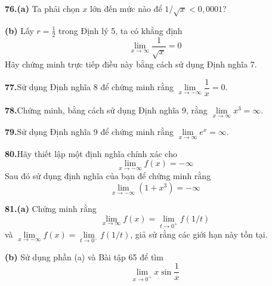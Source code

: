 \hfill
\begin{minipage}[t]{0.485\textwidth}
\small
\noindent
\textbf{76.}\hspace{1.5mm}\textbf{(a)} Ta phải chọn $x$ lớn đến mức nào để $1/\sqrt{x} < 0{,}0001$?

\vspace{1mm}
\noindent
\textbf{(b)} Lấy $r = \frac{1}{2}$ trong Định lý 5, ta có khẳng định
\begin{equation*}
\lim_{x \to \infty} \frac{1}{\sqrt{x}} = 0
\end{equation*}
Hãy chứng minh trực tiếp điều này bằng cách sử dụng Định nghĩa 7.

\vspace{2.8mm}
\noindent
\textbf{77.}\hspace{1.5mm}Sử dụng Định nghĩa 8 để chứng minh rằng $\lim\limits_{x \to -\infty} \dfrac{1}{x} = 0$.

\vspace{2.8mm}
\noindent
\textbf{78.}\hspace{1.5mm}Chứng minh, bằng cách sử dụng Định nghĩa 9, rằng $\lim\limits_{x \to \infty} x^3 = \infty$.

\vspace{2.8mm}
\noindent
\textbf{79.}\hspace{1.5mm}Sử dụng Định nghĩa 9 để chứng minh rằng $\lim\limits_{x \to \infty} e^x = \infty$.

\vspace{2.8mm}
\noindent
\textbf{80.}\hspace{1.5mm}Hãy thiết lập một định nghĩa chính xác cho
\begin{equation*}
\lim_{x \to -\infty} f(x) = -\infty
\end{equation*}
Sau đó sử dụng định nghĩa của bạn để chứng minh rằng
\begin{equation*}
\lim_{x \to -\infty} (1+x^3) = -\infty
\end{equation*}

\vspace{2.5mm}
\noindent
\textbf{81.}\hspace{1.5mm}\textbf{(a)} Chứng minh rằng
\begin{equation*}
\lim_{x \to \infty} f(x) = \lim_{t \to 0^+} f(1/t)
\end{equation*}
và $\lim\limits_{x \to -\infty} f(x) = \lim\limits_{t \to 0^-} f(1/t)$, giả sử rằng các giới hạn này tồn tại.

\vspace{1mm}
\noindent
\textbf{(b)} Sử dụng phần (a) và Bài tập 65 để tìm
\begin{equation*}
\lim_{x \to 0^+} x \sin \frac{1}{x}
\end{equation*}
\end{minipage}

